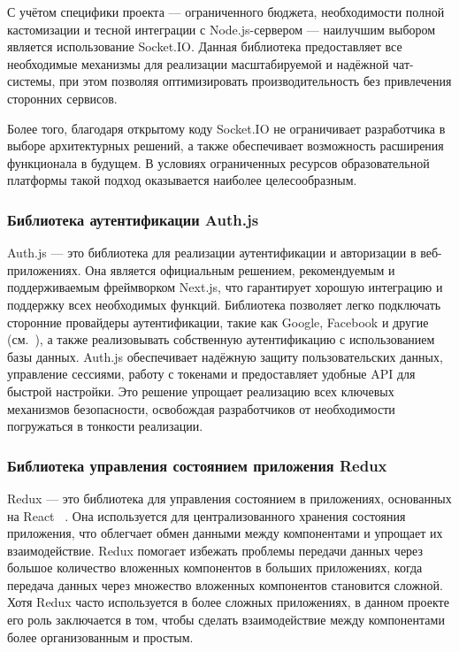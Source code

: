 С учётом специфики проекта — ограниченного бюджета, необходимости полной кастомизации и тесной интеграции с Node.js-сервером — наилучшим выбором является использование Socket.IO. Данная библиотека предоставляет все необходимые механизмы для реализации масштабируемой и надёжной чат-системы, при этом позволяя оптимизировать производительность без привлечения сторонних сервисов.

Более того, благодаря открытому коду Socket.IO не ограничивает разработчика в выборе архитектурных решений, а также обеспечивает возможность расширения функционала в будущем. В условиях ограниченных ресурсов образовательной платформы такой подход оказывается наиболее целесообразным.

\subsubsection*{Библиотека аутентификации Auth.js}

Auth.js — это библиотека для реализации аутентификации и авторизации в веб-приложениях. Она является официальным решением, рекомендуемым и поддерживаемым фреймворком Next.js, что гарантирует хорошую интеграцию и поддержку всех необходимых функций. Библиотека позволяет легко подключать сторонние провайдеры аутентификации, такие как Google, Facebook и другие (см.~\cite{nextauth_docs}), а также реализовывать собственную аутентификацию с использованием базы данных. Auth.js обеспечивает надёжную защиту пользовательских данных, управление сессиями, работу с токенами и предоставляет удобные API для быстрой настройки. Это решение упрощает реализацию всех ключевых механизмов безопасности, освобождая разработчиков от необходимости погружаться в тонкости реализации.  

\subsubsection*{Библиотека управления состоянием приложения Redux}

Redux — это библиотека для управления состоянием в приложениях, основанных на React ~\cite{redux_docs}. Она используется для централизованного хранения состояния приложения, что облегчает обмен данными между компонентами и упрощает их взаимодействие. Redux помогает избежать проблемы передачи данных через большое количество вложенных компонентов в больших приложениях, когда передача данных через множество вложенных компонентов становится сложной. Хотя Redux часто используется в более сложных приложениях, в данном проекте его роль заключается в том, чтобы сделать взаимодействие между компонентами более организованным и простым.

